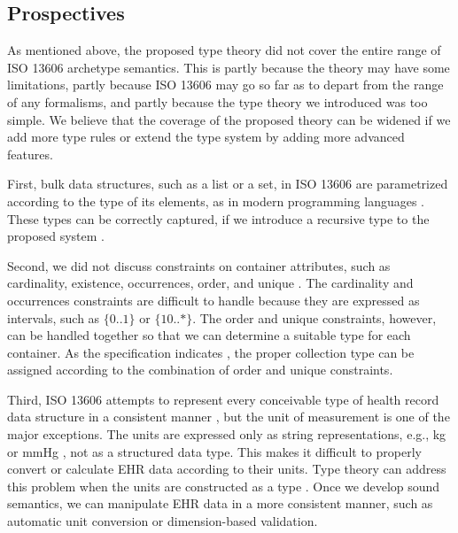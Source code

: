 \documentclass[preprint,3p,onecolumn,times,review]{elsarticle}
\begin{document}
\subsection{Prospectives}

As mentioned above, the proposed type theory did not cover the entire range of ISO 13606 archetype semantics.
This is partly because the theory may have some limitations, partly because ISO 13606 may go so far as to depart from the range of any formalisms, and partly because the type theory we introduced was too simple.
We believe that the coverage of the proposed theory can be widened if we add more type rules or extend the type system by adding more advanced features.

  First, bulk data structures, such as a list or a set, in ISO 13606 are parametrized according to the type of its elements, as in modern programming languages \cite[p.42]{iso08:13606_healt_elect_part1}.
These types can be correctly captured, if we introduce a recursive type to the proposed system \cite{cardelli04:_type_system,geuvers09:_introd_type_theor}.
  
Second, we did not discuss constraints on container attributes, such as cardinality, existence, occurrences, order, and unique \cite[p.83-84]{iso08:13606_healt_elect_part2}. The cardinality and occurrences constraints are difficult to handle because they are expressed as intervals, such as $\{0..1\}$ or $\{10..*\}$. The order and unique constraints, however, can be handled together so that we can determine a suitable type for each container. As the specification indicates \cite[xi]{iso08:13606_healt_elect_part2}, the proper collection type can be assigned according to the combination of order and unique constraints.

Third, ISO 13606 attempts to represent every conceivable type of health record data structure in a consistent manner \cite[vi]{iso08:13606_healt_elect_part1}, but the unit of measurement is one of the major exceptions. The units are expressed only as string representations, e.g., kg or mmHg \cite[p.46,p.82]{iso08:13606_healt_elect_part2}, not as a structured data type. This makes it difficult to properly convert or calculate EHR data according to their units. Type theory can address this problem when the units are constructed as a type \cite{kennedy94:_dimen_types,kennedy10:_types_units_measur}. Once we develop sound semantics, we can manipulate EHR data in a more consistent manner, such as automatic unit conversion or dimension-based validation.
\end{document}
